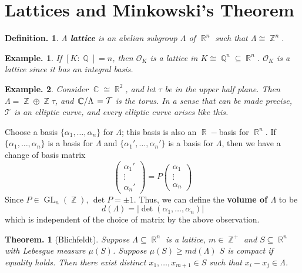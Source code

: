 \documentclass[11pt, a4paper]{memoir}
\DeclareMathOperator{\Q}{{\mathbb{Q}}}
\DeclareMathOperator{\Z}{{\mathbb{Z}}}
\DeclareMathOperator{\R}{{\mathbb{R}}}
\DeclareMathOperator{\C}{{\mathbb{C}}}
\theoremstyle{change}
\newtheorem{theorem}{Theorem.}[section]
\theoremstyle{plain}
\theoremstyle{nonumberplain}
\newtheorem{definition}{Definition.}
\newtheorem{example}{Example.}
\DeclareMathOperator{\GL}{GL}
\newcommand{\quot}[2]{\mathchoice{\left.\raisebox{0.07em}{$#1$}\middle/\raisebox{-0.07em}{$#2$}\right.}
                                 {\left.\raisebox{0.03em}{$#1$}\middle/\raisebox{-0.03em}{$#2$}\right.}
                                 {\left.\raisebox{0.00em}{$#1$}\middle/\raisebox{-0.00em}{$#2$}\right.}
                                 {\left.\raisebox{0em}{$#1$}\middle/\raisebox{0em}{$#2$}\right.}}
\newcommand{\mbf}[1]{{\boldmath\bfseries #1}}
\numberwithin{equation}{section}
\begin{document}
\section{Lattices and Minkowski's Theorem}
\begin{definition}
    A \mbf{lattice} is an abelian subgroup $\Lambda$ of $\R^n$ such that $\Lambda\cong\Z^n$.
\end{definition}
\begin{example}
    If $[K:\Q]=n$, then $\mathcal{O}_K$ is a lattice in $K\cong\Q^n\subseteq\R^n$.
    $\mathcal{O}_K$ is a lattice since it has an integral basis.
\end{example}
\begin{example}
    Consider $\C\cong\R^2$, and let $\tau$ be in the upper half plane.
    Then $\Lambda=\Z\oplus\Z\tau$, and $\quot{\C}{\Lambda}=\mathcal{T}$ is the torus.
    In a sense that can be made precise, $\mathcal{T}$ is an elliptic curve, and every elliptic curve arises like this.
\end{example}
Choose a basis $\{\alpha_1,\ldots,\alpha_n\}$ for $\Lambda$; this basis is also an $\R-$basis for $\R^n$.
If $\{\alpha_1,\ldots,\alpha_n\}$ is a basis for $\Lambda$ and $\{\alpha_1',\ldots,\alpha_n'\}$ is a basis for $\Lambda$, then we have a change of basis matrix
\begin{equation*}
    \begin{pmatrix}\alpha_1'\\\vdots\\\alpha_n'\end{pmatrix}=P\begin{pmatrix}\alpha_1\\\vdots\\\alpha_n\end{pmatrix}
\end{equation*}
Since $P\in\GL_n(\Z)$, $\det P=\pm 1$.
Thus, we can define the \mbf{volume of $\Lambda$} to be
\begin{equation*}
    d(\Lambda)=|\det(\alpha_1,\ldots,\alpha_n)|
\end{equation*}
which is independent of the choice of matrix by the above observation.
\begin{theorem}[Blichfeldt]\label{t:blich}
    Suppose $\Lambda\subseteq\R^n$ is a lattice, $m\in\Z^+$ and $S\subseteq\R^n$ with Lebesgue measure $\mu(S)$.
    Suppose $\mu(S)\geq md(\Lambda)$ $S$ is compact if equality holds.
    Then there exist distinct $x_1,\ldots,x_{m+1}\in S$ such that $x_i-x_j\in\Lambda$.
\end{theorem}
\end{document}
